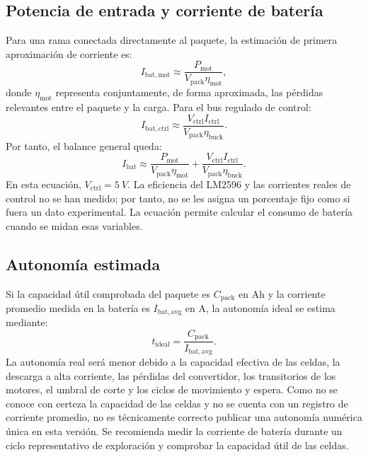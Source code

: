 \documentclass[conference]{IEEEtran}
\begin{document}
\subsection{Potencia de entrada y corriente de batería}
Para una rama conectada directamente al paquete, la estimación de primera aproximación de corriente es:
\begin{equation}
I_{\mathrm{bat,mot}}\approx
\frac{P_{\mathrm{mot}}}{V_{\mathrm{pack}}\eta_{\mathrm{mot}}},
\end{equation}
donde \(\eta_{\mathrm{mot}}\) representa conjuntamente, de forma aproximada, las pérdidas relevantes entre el paquete y la carga. Para el bus regulado de control:
\begin{equation}
I_{\mathrm{bat,ctrl}}\approx
\frac{V_{\mathrm{ctrl}}I_{\mathrm{ctrl}}}
{V_{\mathrm{pack}}\eta_{\mathrm{buck}}}.
\end{equation}
Por tanto, el balance general queda:
\begin{equation}
I_{\mathrm{bat}}\approx
\frac{P_{\mathrm{mot}}}{V_{\mathrm{pack}}\eta_{\mathrm{mot}}}
+\frac{V_{\mathrm{ctrl}}I_{\mathrm{ctrl}}}
{V_{\mathrm{pack}}\eta_{\mathrm{buck}}}.
\label{eq:ibat}
\end{equation}
En esta ecuación, \(V_{\mathrm{ctrl}}=\SI{5}{V}\). La eficiencia del LM2596 y las corrientes reales de control no se han medido; por tanto, no se les asigna un porcentaje fijo como si fuera un dato experimental. La ecuación permite calcular el consumo de batería cuando se midan esas variables.

\subsection{Autonomía estimada}
Si la capacidad útil comprobada del paquete es \(C_{\mathrm{pack}}\) en Ah y la corriente promedio medida en la batería es \(I_{\mathrm{bat,avg}}\) en A, la autonomía ideal se estima mediante:
\begin{equation}
t_{\mathrm{ideal}}=\frac{C_{\mathrm{pack}}}{I_{\mathrm{bat,avg}}}.
\label{eq:runtime}
\end{equation}
La autonomía real será menor debido a la capacidad efectiva de las celdas, la descarga a alta corriente, las pérdidas del convertidor, los transitorios de los motores, el umbral de corte y los ciclos de movimiento y espera. Como no se conoce con certeza la capacidad de las celdas y no se cuenta con un registro de corriente promedio, no es técnicamente correcto publicar una autonomía numérica única en esta versión. Se recomienda medir la corriente de batería durante un ciclo representativo de exploración y comprobar la capacidad útil de las celdas.
\end{document}
